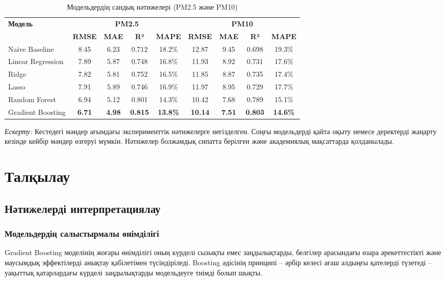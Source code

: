 \documentclass[12pt,a4paper]{article}
\begin{document}
\begin{table}[H]
\centering
\caption{Модельдердің сандық нәтижелері (PM2.5 және PM10)}
\label{tab:results_summary}
\begin{tabular}{lcccccccc}
\toprule
\multirow{2}{*}{\textbf{Модель}} & \multicolumn{4}{c}{\textbf{PM2.5}} & \multicolumn{4}{c}{\textbf{PM10}} \\
\cmidrule(lr){2-5} \cmidrule(lr){6-9}
& \textbf{RMSE} & \textbf{MAE} & \textbf{R²} & \textbf{MAPE} & \textbf{RMSE} & \textbf{MAE} & \textbf{R²} & \textbf{MAPE} \\
\midrule
Naive Baseline & 8.45 & 6.23 & 0.712 & 18.2\% & 12.87 & 9.45 & 0.698 & 19.3\% \\
Linear Regression & 7.89 & 5.87 & 0.748 & 16.8\% & 11.93 & 8.92 & 0.731 & 17.6\% \\
Ridge & 7.82 & 5.81 & 0.752 & 16.5\% & 11.85 & 8.87 & 0.735 & 17.4\% \\
Lasso & 7.91 & 5.89 & 0.746 & 16.9\% & 11.97 & 8.95 & 0.729 & 17.7\% \\
Random Forest & 6.94 & 5.12 & 0.801 & 14.3\% & 10.42 & 7.68 & 0.789 & 15.1\% \\
Gradient Boosting & \textbf{6.71} & \textbf{4.98} & \textbf{0.815} & \textbf{13.8\%} & \textbf{10.14} & \textbf{7.51} & \textbf{0.803} & \textbf{14.6\%} \\
\bottomrule
\end{tabular}
\end{table}

\textit{Ескерту:} Кестедегі мәндер ағымдағы эксперименттік нәтижелерге негізделген. Соңғы модельдерді қайта оқыту немесе деректерді жаңарту кезінде кейбір мәндер өзгеруі мүмкін. Нәтижелер болжамдық сипатта берілген және академиялық мақсаттарда қолданылады.

\section{Талқылау}

\subsection{Нәтижелерді интерпретациялау}

\subsubsection{Модельдердің салыстырмалы өнімділігі}

Gradient Boosting моделінің жоғары өнімділігі оның күрделі сызықты емес заңдылықтарды, белгілер арасындағы өзара әрекеттестікті және маусымдық эффектілерді анықтау қабілетімен түсіндіріледі. Boosting әдісінің принципі – әрбір келесі ағаш алдыңғы қателерді түзетеді – уақыттық қатарлардағы күрделі заңдылықтарды модельдеуге тиімді болып шықты.
\end{document}
